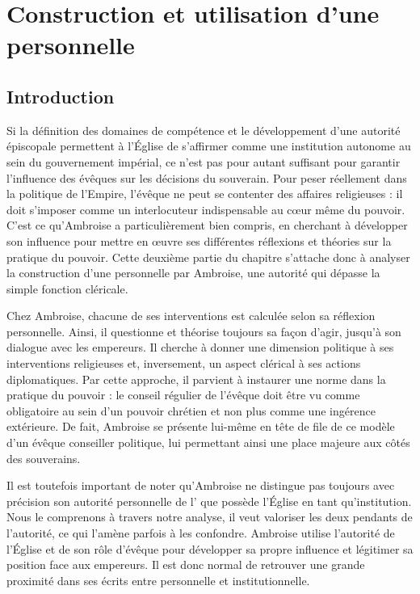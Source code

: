 \section{Construction et utilisation d'une  personnelle}

\subsection*{Introduction}

Si la définition des domaines de compétence et le développement d'une autorité épiscopale permettent à l'Église de s'affirmer comme une institution autonome au sein du gouvernement impérial, ce n'est pas pour autant suffisant pour garantir l'influence des évêques sur les décisions du souverain. Pour peser réellement dans la politique de l'Empire, l'évêque ne peut se contenter des affaires religieuses : il doit s'imposer comme un interlocuteur indispensable au cœur même du pouvoir. C'est ce qu'Ambroise a particulièrement bien compris, en cherchant à développer son influence pour mettre en œuvre ses différentes réflexions et théories sur la pratique du pouvoir. Cette deuxième partie du chapitre s'attache donc à analyser la construction d'une  personnelle par Ambroise, une autorité qui dépasse la simple fonction cléricale.

\bigskip

Chez Ambroise, chacune de ses interventions est calculée selon sa réflexion personnelle. Ainsi, il questionne et théorise toujours sa façon d'agir, jusqu'à son dialogue avec les empereurs. Il cherche à donner une dimension politique à ses interventions religieuses et, inversement, un aspect clérical à ses actions diplomatiques. Par cette approche, il parvient à instaurer une norme dans la pratique du pouvoir : le conseil régulier de l'évêque doit être vu comme obligatoire au sein d'un pouvoir chrétien et non plus comme une ingérence extérieure. De fait, Ambroise se présente lui-même en tête de file de ce modèle d'un évêque conseiller politique, lui permettant ainsi une place majeure aux côtés des souverains.

\bigskip

Il est toutefois important de noter qu'Ambroise ne distingue pas toujours avec précision son autorité personnelle de l' que possède l'Église en tant qu'institution. Nous le comprenons à travers notre analyse, il veut valoriser les deux pendants de l'autorité, ce qui l'amène parfois à les confondre. Ambroise utilise l'autorité de l'Église et de son rôle d'évêque pour développer sa propre influence et légitimer sa position face aux empereurs. Il est donc normal de retrouver une grande proximité dans ses écrits entre  personnelle et  institutionnelle.

